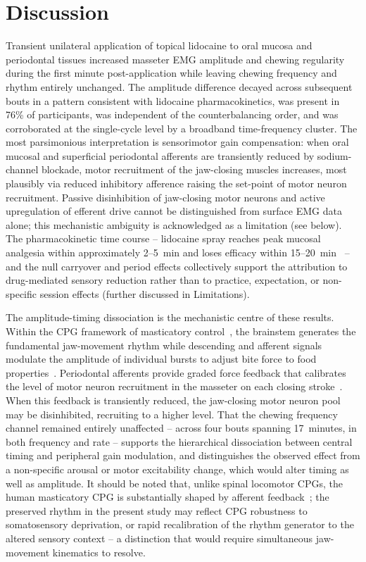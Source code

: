 ﻿\section*{Discussion}

Transient unilateral application of topical lidocaine to oral mucosa and
periodontal tissues increased masseter EMG amplitude and chewing regularity
during the first minute post-application while leaving chewing frequency and
rhythm entirely unchanged.
The amplitude difference decayed across subsequent bouts in a pattern
consistent with lidocaine pharmacokinetics, was present in 76\% of
participants, was independent of the counterbalancing order, and was
corroborated at the single-cycle level by a broadband time-frequency cluster.
The most parsimonious interpretation is sensorimotor gain compensation:
when oral mucosal and superficial periodontal afferents are transiently
reduced by sodium-channel blockade, motor recruitment of the jaw-closing
muscles increases, most plausibly via reduced inhibitory afference raising
the set-point of motor neuron recruitment.
Passive disinhibition of jaw-closing motor neurons and active upregulation
of efferent drive cannot be distinguished from surface EMG data alone;
this mechanistic ambiguity is acknowledged as a limitation (see below).
The pharmacokinetic time course -- lidocaine spray reaches peak mucosal
analgesia within approximately 2--5~min and loses efficacy within
15--20~min~\cite{vonGunten2019} -- and the null carryover and period effects
collectively support the attribution to drug-mediated sensory reduction
rather than to practice, expectation, or non-specific session effects
(further discussed in Limitations).

The amplitude-timing dissociation is the mechanistic centre of these results.
Within the CPG framework of masticatory control~\cite{Lund1991,Grillner2006},
the brainstem generates the fundamental jaw-movement rhythm while descending
and afferent signals modulate the amplitude of individual bursts to adjust
bite force to food properties~\cite{Turker2002,Trulsson2006}.
Periodontal afferents provide graded force feedback that calibrates the level
of motor neuron recruitment in the masseter on each closing
stroke~\cite{Lobbezoo1997}.
When this feedback is transiently reduced, the jaw-closing motor neuron pool
may be disinhibited, recruiting to a higher level.
That the chewing frequency channel remained entirely unaffected -- across four
bouts spanning 17~minutes, in both frequency and rate -- supports the
hierarchical dissociation between central timing and peripheral gain modulation,
and distinguishes the observed effect from a non-specific arousal or motor
excitability change, which would alter timing as well as amplitude.
It should be noted that, unlike spinal locomotor CPGs, the human masticatory
CPG is substantially shaped by afferent feedback~\cite{Lund1991,Trulsson2006}; the
preserved rhythm in the present study may reflect CPG robustness to
somatosensory deprivation, or rapid recalibration of the rhythm generator to
the altered sensory context -- a distinction that would require simultaneous
jaw-movement kinematics to resolve.

